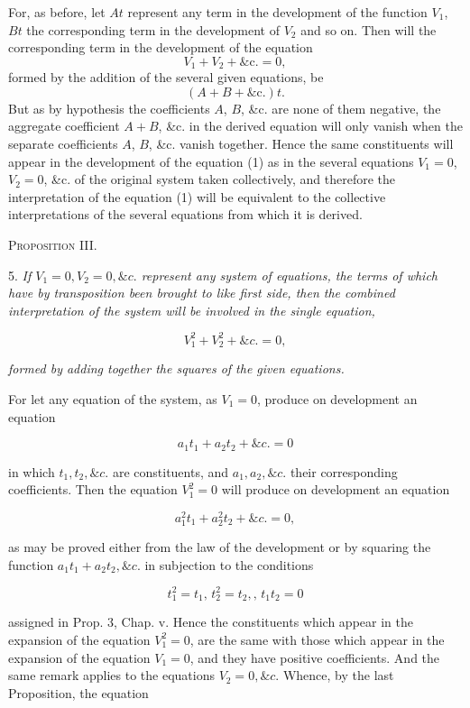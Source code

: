 \documentclass[oneside]{book}
\begin{document}
For, as before, let $At$ represent any term in the development
of the function $V_1$, $Bt$ the corresponding term in the development
of $V_2$ and so on. Then will the corresponding term in the
development of the equation
\setcounter{equation}{0}
\begin{equation}
V_1 + V_2 + \textrm{\&c.} = 0,
\end{equation}
formed by the addition of the several given equations, be
\[
\left(A+B+\textrm{\&c.}\right)t.
\]
But as by hypothesis the coefficients $A$, $B$, \&c. are none of them
negative, the aggregate coefficient $A + B$, \&c. in the derived
equation will only vanish when the separate coefficients $A$, $B$, \&c.
vanish together. Hence the same constituents will appear in the
development of the equation (1) as in the several equations
$V_1=0$, $V_2=0$, \&c. of the original system taken collectively, and
therefore the interpretation of the equation (1) will be equivalent
to the collective interpretations of the several equations from
which it is derived.


\begin{center}
\textsc{Proposition III.}
\end{center}

5. \textit{If $V_1=0, V_2=0, \&c.$ represent any system of equations, the terms of which have by transposition been brought to like first side, then the combined interpretation of the system will be involved in the single equation, }

\[
V_{1}^2 + V_{2}^2 + \&c. = 0,
\]

\textit{formed by adding together the squares of the given equations.}

For let any equation of the system, as $V_1=0$, produce on development an equation

\[
a_1 t_1 + a_2 t_2 + \&c. = 0
\]

in which $t_1, t_2, \&c.$ are constituents, and $a_1, a_2, \&c.$ their corresponding coefficients. Then the equation $V_{1}^2=0$ will produce on development an equation

\[
a_{1}^2 t_1 + a_{2}^2 t_2 + \&c. = 0,
\]

as may be proved either from the law of the development or by
squaring the function $a_1 t_1 + a_2 t_2, \&c.$ in subjection to the conditions

\[
t_{1}^2=t_1 \textrm{, } t_{2}^2=t_2, \textrm{, } t_1 t_2=0
\]

assigned in Prop. 3, Chap. v. Hence the constituents which
appear in the expansion of the equation $V_{1}^2=0$, are the same
with those which appear in the expansion of the equation $V_1=0$,
and they have positive coefficients. And the same remark applies to the equations $V_2=0, \&c.$ Whence, by the last Proposition, the equation
\end{document}
